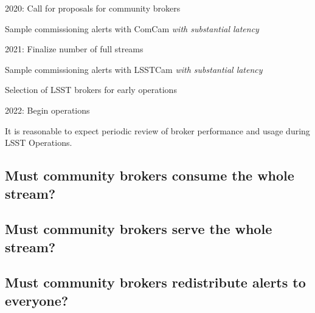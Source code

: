2020: Call for proposals for community brokers

	Sample commissioning alerts with ComCam \textit{with substantial latency}

2021: Finalize number of full streams

	Sample commissioning alerts with LSSTCam \textit{with substantial latency}

	Selection of LSST brokers for early operations

2022: Begin operations

It is reasonable to expect periodic review of broker performance and usage during LSST Operations.


\subsection{Must community brokers consume the whole stream?}

\subsection{Must community brokers serve the whole stream?}

\subsection{Must community brokers redistribute alerts to everyone?}


